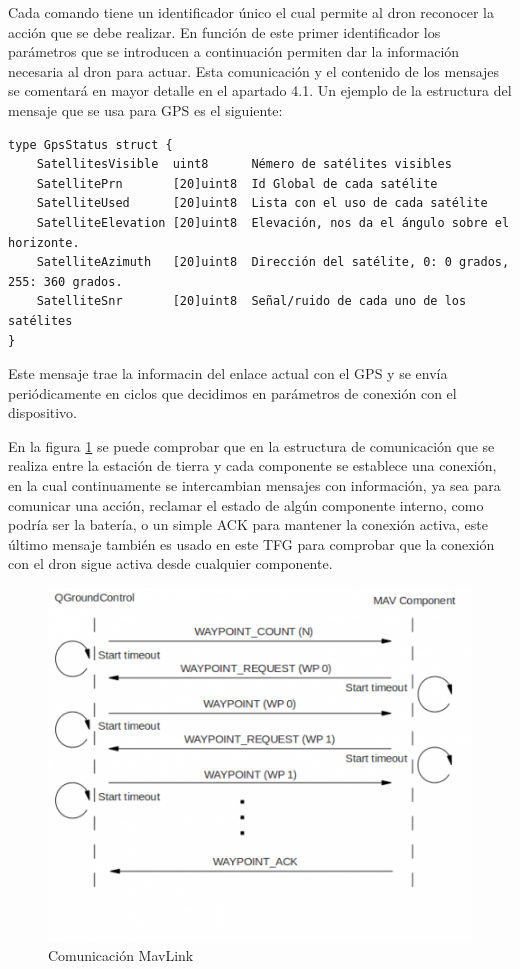Cada comando tiene un identificador único  el cual permite al dron reconocer la acción que se debe realizar. En función de este primer identificador los parámetros que se introducen a continuación permiten dar la información necesaria al dron para actuar. Esta comunicación y el contenido de los mensajes se comentará en mayor detalle en el apartado 4.1. Un ejemplo de la estructura del mensaje que se usa para GPS es el siguiente:
{\scriptsize
\begin{verbatim}
type GpsStatus struct {
    SatellitesVisible  uint8      Némero de satélites visibles
    SatellitePrn       [20]uint8  Id Global de cada satélite
    SatelliteUsed      [20]uint8  Lista con el uso de cada satélite
    SatelliteElevation [20]uint8  Elevación, nos da el ángulo sobre el horizonte.
    SatelliteAzimuth   [20]uint8  Dirección del satélite, 0: 0 grados, 255: 360 grados.
    SatelliteSnr       [20]uint8  Señal/ruido de cada uno de los satélites
}
\end{verbatim}}
Este mensaje trae la informacin del enlace actual con el GPS y se envía periódicamente en ciclos que decidimos en parámetros de conexión con el dispositivo.

En la figura \ref{fig:comunicacionMavLink} se puede comprobar que en la estructura de comunicación que se realiza entre la estación de tierra y cada componente se establece una conexión, en la cual continuamente se intercambian mensajes con información, ya sea para comunicar una acción, reclamar el estado de algún componente interno, como podría ser la batería, o un simple ACK para mantener la conexión activa, este último mensaje también es usado en este TFG para comprobar que la conexión con el dron sigue activa desde cualquier componente.


\begin{figure}[H]
  \centering
  \includegraphics[scale=0.5]{imagenes/comunicacionMavLink.png}
  \caption{Comunicación MavLink}
  \label{fig:comunicacionMavLink}
\end{figure}

